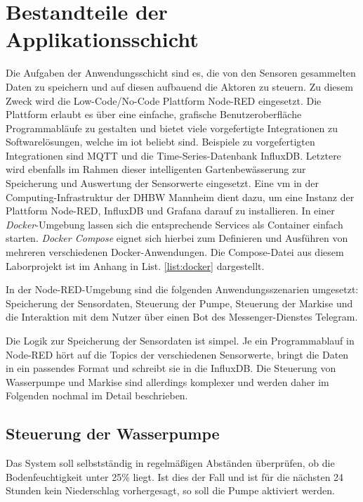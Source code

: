 
\section{Bestandteile der Applikationsschicht}

Die Aufgaben der Anwendungsschicht sind es, die von den Sensoren gesammelten Daten zu speichern und auf diesen aufbauend die Aktoren zu steuern.
Zu diesem Zweck wird die Low-Code/No-Code Plattform Node-RED eingesetzt. Die Plattform erlaubt es über eine einfache, grafische Benutzeroberfläche Programmabläufe zu gestalten und bietet viele vorgefertigte Integrationen zu Softwarelösungen, welche im \gls{iot} beliebt sind.
Beispiele zu vorgefertigten Integrationen sind MQTT und die Time-Series-Datenbank InfluxDB.
Letztere wird ebenfalls im Rahmen dieser intelligenten Gartenbewässerung zur Speicherung und Auswertung der Sensorwerte eingesetzt. Eine \gls{vm} in der Computing-Infrastruktur der DHBW Mannheim dient dazu, um eine Instanz der Plattform Node-RED, InfluxDB und Grafana darauf zu installieren.
In einer \textit{Docker}-Umgebung lassen sich die entsprechende Services als Container einfach starten. \textit{Docker Compose} eignet sich hierbei zum Definieren und Ausführen von mehreren verschiedenen Docker-Anwendungen. Die Compose-Datei aus diesem Laborprojekt ist im Anhang in List. \ref{list:docker} dargestellt.

In der Node-RED-Umgebung sind die folgenden Anwendungsszenarien umgesetzt: Speicherung der Sensordaten, Steuerung der Pumpe, Steuerung der Markise und die Interaktion mit dem Nutzer über einen Bot des Messenger-Dienstes Telegram.

Die Logik zur Speicherung der Sensordaten ist simpel.
Je ein Programmablauf in Node-RED hört auf die Topics der verschiedenen Sensorwerte, bringt die Daten in ein passendes Format und schreibt sie in die InfluxDB.
Die Steuerung von Wasserpumpe und Markise sind allerdings komplexer und werden daher im Folgenden nochmal im Detail beschrieben.

\subsection{Steuerung der Wasserpumpe}

Das System soll selbstständig in regelmäßigen Abständen überprüfen, ob die Bodenfeuchtigkeit unter 25\% liegt.
Ist dies der Fall und ist für die nächsten 24 Stunden kein Niederschlag vorhergesagt, so soll die Pumpe aktiviert werden.

